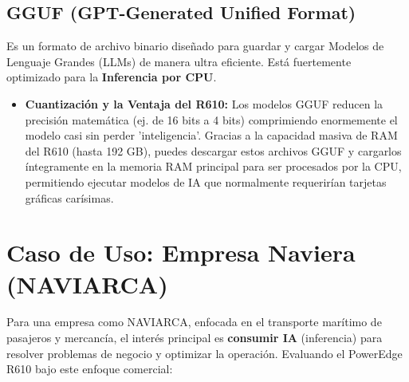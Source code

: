 \documentclass[12pt,a4paper]{article}
\begin{document}
\subsection{GGUF (GPT-Generated Unified Format)}
Es un formato de archivo binario diseñado para guardar y cargar Modelos de Lenguaje Grandes (LLMs) de manera ultra eficiente. Está fuertemente optimizado para la \textbf{Inferencia por CPU}.
\begin{itemize}
    \item \textbf{Cuantización y la Ventaja del R610:} Los modelos GGUF reducen la precisión matemática (ej. de 16 bits a 4 bits) comprimiendo enormemente el modelo casi sin perder 'inteligencia'. Gracias a la capacidad masiva de RAM del R610 (hasta 192 GB), puedes descargar estos archivos GGUF y cargarlos íntegramente en la memoria RAM principal para ser procesados por la CPU, permitiendo ejecutar modelos de IA que normalmente requerirían tarjetas gráficas carísimas.
\end{itemize}

\section{Caso de Uso: Empresa Naviera (NAVIARCA)}
Para una empresa como NAVIARCA, enfocada en el transporte marítimo de pasajeros y mercancía, el interés principal es \textbf{consumir IA} (inferencia) para resolver problemas de negocio y optimizar la operación. Evaluando el PowerEdge R610 bajo este enfoque comercial:
\end{document}
